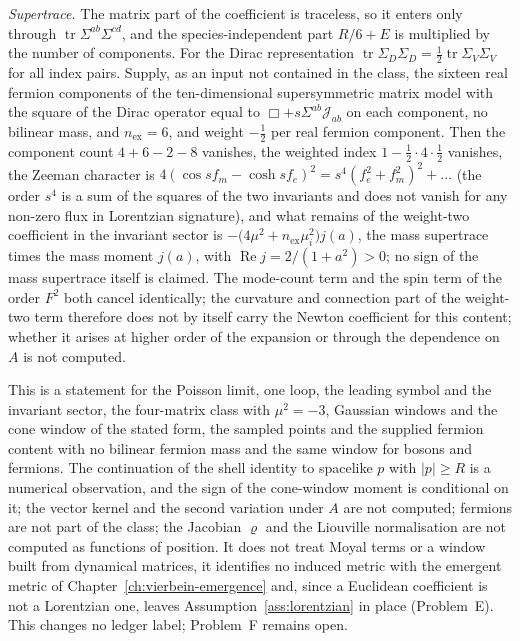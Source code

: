 \emph{Supertrace.} The matrix part of the coefficient is traceless, so it enters only through \(\operatorname{tr}\Sigma^{ab}\Sigma^{cd}\), and the species-independent part \(R/6+E\) is multiplied by the number of components. For the Dirac representation \(\operatorname{tr}\Sigma_D\Sigma_D=\tfrac12\operatorname{tr}\Sigma_V\Sigma_V\) for all index pairs. Supply, as an input not contained in the class, the sixteen real fermion components of the ten-dimensional supersymmetric matrix model with the square of the Dirac operator equal to \(\Box+s\Sigma^{ab}\mathcal J_{ab}\) on each component, no bilinear mass, and \(n_{\mathrm{ex}}=6\), and weight \(-\tfrac12\) per real fermion component. Then the component count \(4+6-2-8\) vanishes, the weighted index \(1-\tfrac12\cdot4\cdot\tfrac12\) vanishes, the Zeeman character is \(4(\cos sf_m-\cosh sf_e)^2=s^4(f_e^2+f_m^2)^2+\dots\) (the order \(s^4\) is a sum of the squares of the two invariants and does not vanish for any non-zero flux in Lorentzian signature), and what remains of the weight-two coefficient in the invariant sector is \(-\bigl(4\mu^2+n_{\mathrm{ex}}\mu_i^2\bigr)j(a)\), the mass supertrace times the mass moment \(j(a)\), with \(\operatorname{Re}j=2/(1+a^2)>0\); no sign of the mass supertrace itself is claimed. The mode-count term and the spin term of the order \(F^2\) both cancel identically; the curvature and connection part of the weight-two term therefore does not by itself carry the Newton coefficient for this content; whether it arises at higher order of the expansion or through the dependence on \(A\) is not computed.



This is a statement for the Poisson limit, one loop, the leading symbol and the invariant sector, the four-matrix class with \(\mu^2=-3\), Gaussian windows and the cone window of the stated form, the sampled points and the supplied fermion content with no bilinear fermion mass and the same window for bosons and fermions. The continuation of the shell identity to spacelike \(p\) with \(|p|\ge R\) is a numerical observation, and the sign of the cone-window moment is conditional on it; the vector kernel and the second variation under \(A\) are not computed; fermions are not part of the class; the Jacobian \(\varrho\) and the Liouville normalisation are not computed as functions of position. It does not treat Moyal terms or a window built from dynamical matrices, it identifies no induced metric with the emergent metric of Chapter~\ref{ch:vierbein-emergence} and, since a Euclidean coefficient is not a Lorentzian one, leaves Assumption~\ref{ass:lorentzian} in place (Problem~E). This changes no ledger label; Problem~F remains open.



